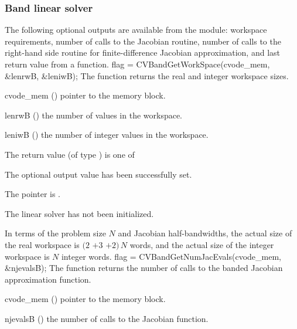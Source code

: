 \subsubsection{Band linear solver}\label{sss:optout_band}
The following optional outputs are available from the {\cvband} module:
workspace requirements, number of calls to the Jacobian routine, number of 
calls to the right-hand side routine for finite-difference Jacobian approximation,
and last return value from a {\cvband} function.
{
  flag = CVBandGetWorkSpace(cvode\_mem, \&lenrwB, \&leniwB);
}
{
  The function  returns the
  {\cvband} real and integer workspace sizes.
}
{
  \begin{args}
  \item[cvode\_mem] ()
    pointer to the {\cvode} memory block.
  \item[lenrwB] ()
    the number of  values in the {\cvband} workspace.
  \item[leniwB] ()
    the number of integer values in the {\cvband} workspace.
  \end{args}
}
{
  The return value  (of type ) is one of
  \begin{args}
  \item[\Id{CVBAND\_SUCCESS}] 
    The optional output value has been successfully set.
  \item[\Id{CVBAND\_MEM\_NULL}]
    The  pointer is .
  \item[\Id{CVBAND\_LMEM\_NULL}]
    The {\cvband} linear solver has not been initialized.
  \end{args}
}
{
  In terms of the problem size $N$ and Jacobian half-bandwidths, 
  the actual size of the real workspace is
  $(2$ $+ 3$  $+ 2)\, N$  words,
  and the actual size of the integer workspace is $N$ integer words.
}
{
  flag = CVBandGetNumJacEvals(cvode\_mem, \&njevalsB);
}
{
  The function  returns the
  number of calls to the banded Jacobian approximation function.
}
{
  \begin{args}
  \item[cvode\_mem] ()
    pointer to the {\cvode} memory block.
  \item[njevalsB] ()
    the number of calls to the Jacobian function.
  \end{args}
}
